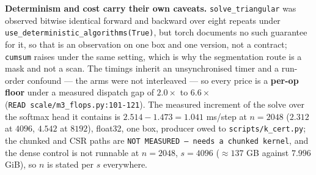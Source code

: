 \documentclass[11pt,a4paper]{article}
\theoremstyle{plain}
\theoremstyle{definition}
\theoremstyle{remark}
\begin{document}
\textbf{Determinism and cost carry their own caveats.}
\texttt{solve\_triangular} was observed bitwise identical forward and
backward over eight repeats under
\texttt{use\_deterministic\_algorithms(True)}, but torch documents no
such guarantee for it, so that is an observation on one box and one
version, not a contract; \texttt{cumsum} raises under the same setting,
which is why the segmentation route is a mask and not a scan. The
timings inherit an unsynchronised timer and a run-order confound --- the
arms were not interleaved --- so every price is a \textbf{per-op floor}
under a measured dispatch gap of \(2.0\times\) to \(6.6\times\)
(\texttt{READ\ scale/m3\_flops.py:101-121}). The measured increment of
the solve over the softmax head it contains is \(2.514-1.473 = 1.041\)
ms/step at \(n=2048\) (\(2.312\) at \(4096\), \(4.542\) at \(8192\)),
float32, one box, producer owed to \texttt{scripts/k\_cert.py}; the
chunked and CSR paths are
\texttt{NOT\ MEASURED\ —\ needs\ a\ chunked\ kernel}, and the dense
control is not runnable at \(n=2048\), \(s=4096\) (\(\approx137\) GB
against \(7.996\) GiB), so \(n\) is stated per \(s\) everywhere.
\end{document}
